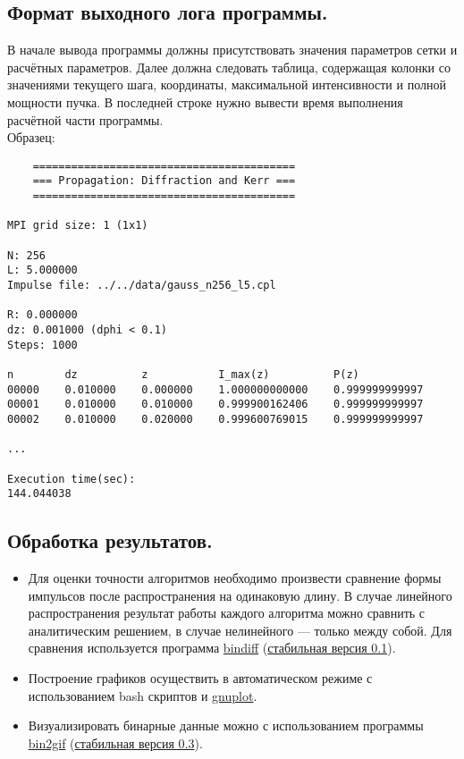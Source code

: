\subsection{Формат выходного лога программы.}
В начале вывода программы должны присутствовать значения параметров сетки и расчётных параметров.
Далее должна следовать таблица, содержащая колонки со значениями текущего шага, координаты, максимальной интенсивности и полной мощности пучка. В последней строке нужно вывести время выполнения расчётной части программы. \\
Образец:
\begin{verbatim}
    =========================================
    === Propagation: Diffraction and Kerr ===
    =========================================

MPI grid size: 1 (1x1)

N: 256
L: 5.000000
Impulse file: ../../data/gauss_n256_l5.cpl

R: 0.000000
dz: 0.001000 (dphi < 0.1)
Steps: 1000

n        dz          z           I_max(z)          P(z)
00000    0.010000    0.000000    1.000000000000    0.999999999997
00001    0.010000    0.010000    0.999900162406    0.999999999997
00002    0.010000    0.020000    0.999600769015    0.999999999997

...

Execution time(sec):
144.044038
\end{verbatim}


\subsection{Обработка результатов.}
\begin{itemize}
	\item Для оценки точности алгоритмов необходимо произвести сравнение формы импульсов после распространения на одинаковую длину.
		В случае линейного распространения результат работы каждого алгоритма можно сравнить с аналитическим решением,
		в случае нелинейного --- только между собой. Для сравнения используется программа \href{http://github.com/Sannis/bindiff/}{bindiff}
(\href{http://github.com/Sannis/bindiff/tarball/v1.0}{стабильная версия 0.1}).
		
	\item Построение графиков осуществить в автоматическом режиме с использованием bash скриптов и \href{http://www.gnuplot.info/}{gnuplot}.
	
	\item Визуализировать бинарные данные можно с использованием программы \href{http://github.com/Sannis/bin2gif/}{bin2gif}
(\href{http://github.com/Sannis/bin2gif/tarball/v0.3}{стабильная версия 0.3}).
\end{itemize}


